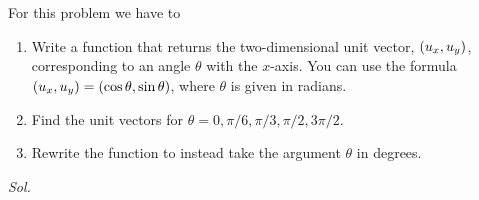     \begin{problem}\label{problem_2.4}
        For this problem we have to
        \begin{enumerate}
            \item Write a function that returns the two-dimensional unit vector, $\qty(u_x,u_y)$, corresponding to an angle $\theta$ with the $x$-axis. You can use the formula $\qty(u_x,u_y)=\qty(\cos{\theta},\sin{\theta})$, where $\theta$ is given in radians.
            \item Find the unit vectors for $\theta = 0, \pi/6, \pi/3, \pi/2, 3\pi/2$.
            \item Rewrite the function to instead take the argument $\theta$ in degrees.
        \end{enumerate}
    \end{problem}
    \textit{ Sol. } 
    


